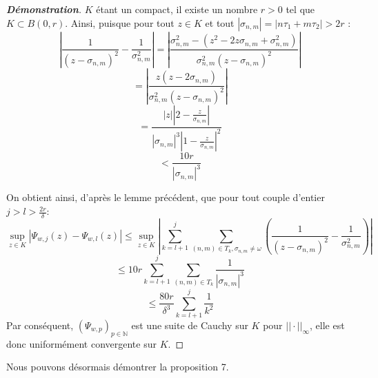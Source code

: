 \documentclass[12pt]{article}
\begin{document}
        \begin{proof}[\textbf{Démonstration}]
        \(K\) étant un compact, il existe un nombre \(r > 0\) tel que \(K \subset B(0,r)\). Ainsi, puisque pour tout \(z \in K\) et tout \(|\sigma_{n,m}| = |n \tau_1 + m \tau_2| > 2r\) :
        \[
        \left| \frac{1}{(z - \sigma_{n,m})^2} - \frac{1}{\sigma_{n,m}^2} \right| = \left| \frac{\sigma_{n,m}^2 - (z^2 - 2z\sigma_{n,m} + \sigma_{n,m}^2)}{\sigma_{n,m}^2 (z - \sigma_{n,m})^2} \right|
        \]
        \[
        = \left| \frac{z(z - 2\sigma_{n,m})}{\sigma_{n,m}^2 (z - \sigma_{n,m})^2} \right|
        \]
        \[
        = \frac{|z| \left| 2 - \frac{z}{\sigma_{n,m}} \right|}{|\sigma_{n,m}|^3 \left| 1 - \frac{z}{\sigma_{n,m}} \right|^2}
        \]
        \[
        < \frac{10r}{|\sigma_{n,m}|^3}
        \]

        On obtient ainsi, d'après le lemme précédent, que pour tout couple d'entier \( j > l > \frac{2r}{\delta} \):
        \[
        \sup_{z \in K} | \Psi_{w,j}(z) - \Psi_{w,l}(z) | \leq \sup_{z \in K} \left| \sum_{k=l+1}^{j} \sum_{(n,m) \in T_k, \sigma_{n,m} \neq \omega} \left( \frac{1}{(z - \sigma_{n,m})^2} - \frac{1}{\sigma_{n,m}^2} \right) \right|
        \]
        \[
        \leq 10r \sum_{k=l+1}^{j} \sum_{(n,m) \in T_k} \frac{1}{|\sigma_{n,m}|^3}
        \]
        \[
        \leq \frac{80r}{\delta^3} \sum_{k=l+1}^{j} \frac{1}{k^2}
        \]
        Par conséquent, \((\Psi_{w,p})_{p \in \mathbb{N}}\) est une suite de Cauchy sur \(K\) pour \(||\cdot||_{\infty}\), elle est donc uniformément convergente sur \(K\).
        \end{proof}

        Nous pouvons désormais démontrer la proposition 7.
\end{document}
